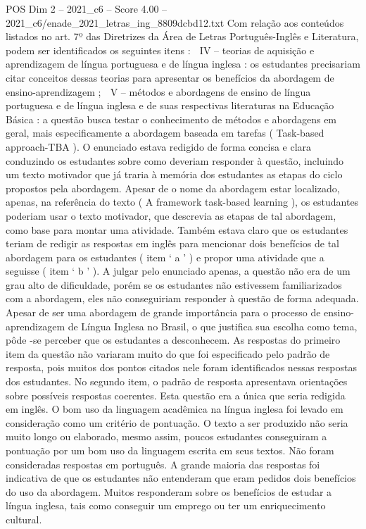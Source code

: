 \begin{textsample}{POS Dim 2 – 2021\_c6 – Score 4.00 – 2021\_c6/enade\_2021\_letras\_ing\_8809dcbd12.txt}
Com relação aos conteúdos listados no art. 7º das Diretrizes da Área de Letras Português-Inglês e Literatura, podem ser identificados os seguintes itens :  IV – teorias de aquisição e aprendizagem de língua portuguesa e de língua inglesa : os estudantes precisariam citar conceitos dessas teorias para apresentar os benefícios da abordagem de ensino-aprendizagem ;  V – métodos e abordagens de ensino de língua portuguesa e de língua inglesa e de suas respectivas literaturas na Educação Básica : a questão busca testar o conhecimento de métodos e abordagens em geral, mais especificamente a abordagem baseada em tarefas ( Task-based approach-TBA ).
O enunciado estava redigido de forma concisa e clara conduzindo os estudantes sobre como deveriam responder à questão, incluindo um texto motivador que já traria à memória dos estudantes as etapas do ciclo propostos pela abordagem.
Apesar de o nome da abordagem estar localizado, apenas, na referência do texto ( A framework task-based learning ), os estudantes poderiam usar o texto motivador, que descrevia as etapas de tal abordagem, como base para montar uma atividade.
Também estava claro que os estudantes teriam de redigir as respostas em inglês para mencionar dois benefícios de tal abordagem para os estudantes ( item ‘ a ’ ) e propor uma atividade que a seguisse ( item ‘ b ’ ).
A julgar pelo enunciado apenas, a questão não era de um grau alto de dificuldade, porém se os estudantes não estivessem familiarizados com a abordagem, eles não conseguiriam responder à questão de forma adequada.
Apesar de ser uma abordagem de grande importância para o processo de ensino-aprendizagem de Língua Inglesa no Brasil, o que justifica sua escolha como tema, pôde -se perceber que os estudantes a desconhecem.
As respostas do primeiro item da questão não variaram muito do que foi especificado pelo padrão de resposta, pois muitos dos pontos citados nele foram identificados nessas respostas dos estudantes.
No segundo item, o padrão de resposta apresentava orientações sobre possíveis respostas coerentes.
Esta questão era a única que seria redigida em inglês.
O bom uso da linguagem acadêmica na língua inglesa foi levado em consideração como um critério de pontuação.
O texto a ser produzido não seria muito longo ou elaborado, mesmo assim, poucos estudantes conseguiram a pontuação por um bom uso da linguagem escrita em seus textos.
Não foram consideradas respostas em português.
A grande maioria das respostas foi indicativa de que os estudantes não entenderam que eram pedidos dois benefícios do uso da abordagem.
Muitos responderam sobre os benefícios de estudar a língua inglesa, tais como conseguir um emprego ou ter um enriquecimento cultural.

\end{textsample}
